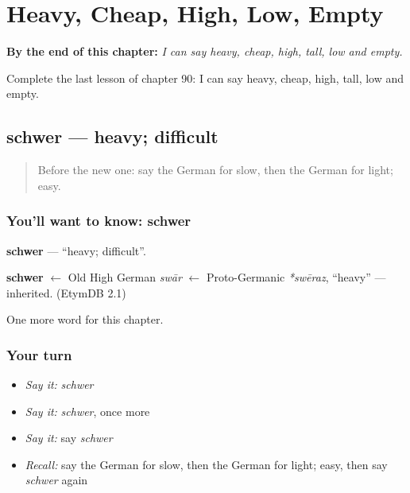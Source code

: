 
\chapter{Heavy, Cheap, High, Low, Empty}
\label{ch:ge-heavy-cheap-high-low-empty}

\begin{chapteropening}
\textbf{By the end of this chapter:} \emph{I can say heavy, cheap, high, tall, low and empty.}

Complete the last lesson of chapter 90: I can say heavy, cheap, high, tall, low and empty.
\end{chapteropening}

\section[schwer]{schwer — heavy; difficult}

\label{lesson:GE-C90-schwer}



\begin{quote}
Before the new one: say the German for slow, then the German for light; easy.
\end{quote}

\subsection*{You'll want to know: schwer}
\textbf{schwer} — \textquotedblleft{}heavy; difficult\textquotedblright{}.

\begin{cousinweb}
\textbf{schwer} $\leftarrow$ Old High German \emph{swār} $\leftarrow$ Proto-Germanic \emph{*swēraz}, \textquotedblleft{}heavy\textquotedblright{} — inherited. (EtymDB 2.1)
\end{cousinweb}

\begin{grammarlens}[title={What you've built}]
One more word for this chapter.
\end{grammarlens}

\subsection*{Your turn}
\begin{itemize}
\raggedright
  \item \emph{Say it:} \emph{schwer}
  \item \emph{Say it:} \emph{schwer}, once more
  \item \emph{Say it:} say \emph{schwer}
  \item \emph{Recall:} say the German for slow, then the German for light; easy, then say \emph{schwer} again
\end{itemize}

